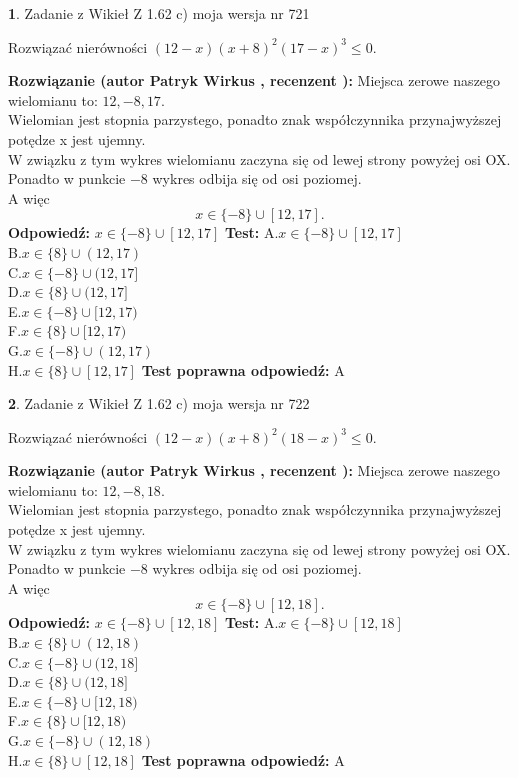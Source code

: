 \documentclass[12pt, a4paper]{article}
\theoremstyle{definition} %
\newtheorem{zad}{}
\newcommand{\zadStart}[1]{\begin{zad}#1\newline}
\newcommand{\zadStop}{\end{zad}}
\newcommand{\rozwStart}[2]{\noindent \textbf{Rozwiązanie (autor #1 , recenzent #2): }\newline}
\newcommand{\rozwStop}{\newline}
\newcommand{\odpStart}{\noindent \textbf{Odpowiedź:}\newline}
\newcommand{\odpStop}{\newline}
\newcommand{\testStart}{\noindent \textbf{Test:}\newline}
\newcommand{\testStop}{\newline}
\newcommand{\kluczStart}{\noindent \textbf{Test poprawna odpowiedź:}\newline}
\newcommand{\kluczStop}{\newline}
\begin{document}
\zadStart{Zadanie z Wikieł Z 1.62 c) moja wersja nr 721}

Rozwiązać nierówności $(12-x)(x+8)^{2}(17-x)^{3}\le0$.
\zadStop
\rozwStart{Patryk Wirkus}{}
Miejsca zerowe naszego wielomianu to: $12, -8, 17$.\\
Wielomian jest stopnia parzystego, ponadto znak współczynnika przy\linebreak najwyższej potędze x jest ujemny.\\ W związku z tym wykres wielomianu zaczyna się od lewej strony powyżej osi OX.\\
Ponadto w punkcie $-8$ wykres odbija się od osi poziomej.\\
A więc $$x \in \{-8\} \cup [12,17].$$
\rozwStop
\odpStart
$x \in \{-8\} \cup [12,17]$
\odpStop
\testStart
A.$x \in \{-8\} \cup [12,17]$\\
B.$x \in \{8\} \cup (12,17)$\\
C.$x \in \{-8\} \cup (12,17]$\\
D.$x \in \{8\} \cup (12,17]$\\
E.$x \in \{-8\} \cup [12,17)$\\
F.$x \in \{8\} \cup [12,17)$\\
G.$x \in \{-8\} \cup (12,17)$\\
H.$x \in \{8\} \cup [12,17]$
\testStop
\kluczStart
A
\kluczStop



\zadStart{Zadanie z Wikieł Z 1.62 c) moja wersja nr 722}

Rozwiązać nierówności $(12-x)(x+8)^{2}(18-x)^{3}\le0$.
\zadStop
\rozwStart{Patryk Wirkus}{}
Miejsca zerowe naszego wielomianu to: $12, -8, 18$.\\
Wielomian jest stopnia parzystego, ponadto znak współczynnika przy\linebreak najwyższej potędze x jest ujemny.\\ W związku z tym wykres wielomianu zaczyna się od lewej strony powyżej osi OX.\\
Ponadto w punkcie $-8$ wykres odbija się od osi poziomej.\\
A więc $$x \in \{-8\} \cup [12,18].$$
\rozwStop
\odpStart
$x \in \{-8\} \cup [12,18]$
\odpStop
\testStart
A.$x \in \{-8\} \cup [12,18]$\\
B.$x \in \{8\} \cup (12,18)$\\
C.$x \in \{-8\} \cup (12,18]$\\
D.$x \in \{8\} \cup (12,18]$\\
E.$x \in \{-8\} \cup [12,18)$\\
F.$x \in \{8\} \cup [12,18)$\\
G.$x \in \{-8\} \cup (12,18)$\\
H.$x \in \{8\} \cup [12,18]$
\testStop
\kluczStart
A
\kluczStop
\end{document}
